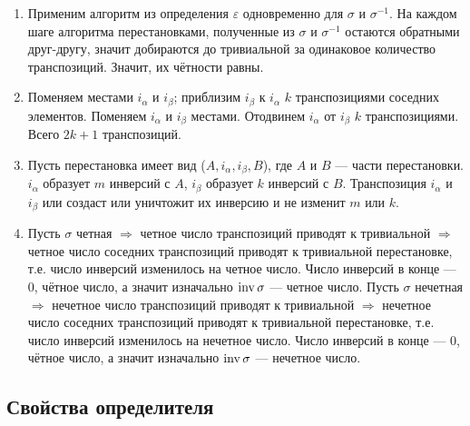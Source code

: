 \begin{enumerate}
    \item Применим алгоритм из определения \(\varepsilon\) одновременно для \(\sigma\) и \(\sigma^{-1}\). На каждом шаге алгоритма перестановками, полученные из \(\sigma\) и \(\sigma^{-1}\) остаются обратными друг-другу, значит добираются до тривиальной за одинаковое количество транспозиций. Значит, их чётности равны.
    \item Поменяем местами \(i_\alpha\) и \(i_\beta\); приблизим \(i_\beta\) к \(i_\alpha\) \(k\) транспозициями соседних элементов. Поменяем \(i_\alpha\) и \(i_\beta\) местами. Отодвинем \(i_\alpha\) от \(i_\beta\) \(k\) транспозициями. Всего \(2k + 1\) транспозиций.
    \item Пусть перестановка имеет вид (\(A, i_\alpha, i_\beta, B\)), где \(A\) и \(B\) --- части перестановки. \(i_\alpha\) образует \(m\) инверсий с \(A\), \(i_\beta\) образует \(k\) инверсий с \(B\). Транспозиция  \(i_\alpha\) и \(i_\beta\) или создаст или уничтожит их инверсию и не изменит \(m\) или \(k\).
    \item  Пусть \(\sigma\) четная \(\Rightarrow\) четное число транспозиций приводят к тривиальной \(\Rightarrow\) четное число соседних транспозиций приводят к тривиальной перестановке, т.е. число инверсий изменилось на четное число. Число инверсий в конце --- 0, чётное число, а значит изначально \(\operatorname{inv} \sigma\) --- четное число. Пусть \(\sigma\) нечетная \(\Rightarrow\) нечетное число транспозиций приводят к тривиальной \(\Rightarrow\) нечетное число соседних транспозиций приводят к тривиальной перестановке, т.е. число инверсий изменилось на нечетное число. Число инверсий в конце --- 0, чётное число, а значит изначально \(\operatorname{inv} \sigma\) --- нечетное число.
\end{enumerate}



\subsection{Свойства определителя}

